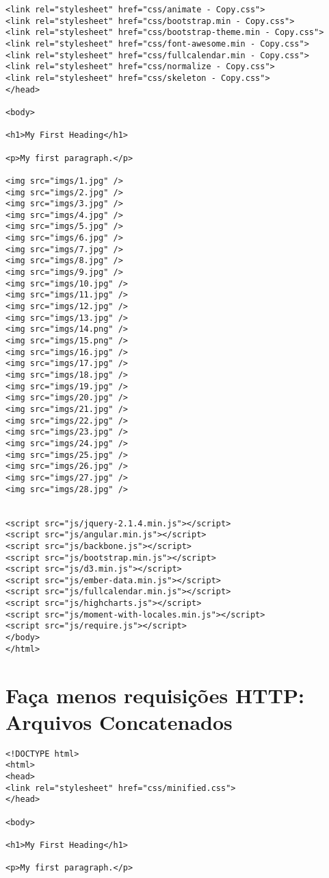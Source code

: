 \begin{apendicesenv}
\begin{lstlisting}
<link rel="stylesheet" href="css/animate - Copy.css">
<link rel="stylesheet" href="css/bootstrap.min - Copy.css">
<link rel="stylesheet" href="css/bootstrap-theme.min - Copy.css">
<link rel="stylesheet" href="css/font-awesome.min - Copy.css">
<link rel="stylesheet" href="css/fullcalendar.min - Copy.css">
<link rel="stylesheet" href="css/normalize - Copy.css">
<link rel="stylesheet" href="css/skeleton - Copy.css">
</head>

<body>

<h1>My First Heading</h1>

<p>My first paragraph.</p>

<img src="imgs/1.jpg" />
<img src="imgs/2.jpg" />
<img src="imgs/3.jpg" />
<img src="imgs/4.jpg" />
<img src="imgs/5.jpg" />
<img src="imgs/6.jpg" />
<img src="imgs/7.jpg" />
<img src="imgs/8.jpg" />
<img src="imgs/9.jpg" />
<img src="imgs/10.jpg" />
<img src="imgs/11.jpg" />
<img src="imgs/12.jpg" />
<img src="imgs/13.jpg" />
<img src="imgs/14.png" />
<img src="imgs/15.png" />
<img src="imgs/16.jpg" />
<img src="imgs/17.jpg" />
<img src="imgs/18.jpg" />
<img src="imgs/19.jpg" />
<img src="imgs/20.jpg" />
<img src="imgs/21.jpg" />
<img src="imgs/22.jpg" />
<img src="imgs/23.jpg" />
<img src="imgs/24.jpg" />
<img src="imgs/25.jpg" />
<img src="imgs/26.jpg" />
<img src="imgs/27.jpg" />
<img src="imgs/28.jpg" />
	

<script src="js/jquery-2.1.4.min.js"></script>
<script src="js/angular.min.js"></script>
<script src="js/backbone.js"></script>
<script src="js/bootstrap.min.js"></script>
<script src="js/d3.min.js"></script>
<script src="js/ember-data.min.js"></script>
<script src="js/fullcalendar.min.js"></script>
<script src="js/highcharts.js"></script>
<script src="js/moment-with-locales.min.js"></script>
<script src="js/require.js"></script>
</body>
</html>
\end{lstlisting}

\chapter{Faça menos requisições HTTP: Arquivos Concatenados}
\label{apend:codigo_facamenosrequisicoeshttp_concat}

\begin{lstlisting}
<!DOCTYPE html>
<html>
<head>
<link rel="stylesheet" href="css/minified.css">
</head>

<body>

<h1>My First Heading</h1>

<p>My first paragraph.</p>
	

\end{lstlisting}
\end{apendicesenv}
